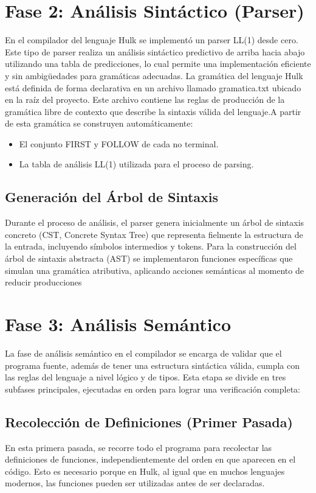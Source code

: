 \documentclass[a4paper,12pt]{article}
\begin{document}
\section{ Fase 2: Análisis Sintáctico (Parser)}
En el compilador del lenguaje Hulk se implementó un parser LL(1) desde cero. Este tipo de parser realiza un análisis sintáctico predictivo de arriba hacia abajo utilizando una tabla de predicciones, lo cual permite una implementación eficiente y sin ambigüedades para gramáticas adecuadas.
\newline
La gramática del lenguaje Hulk está definida de forma declarativa en un archivo llamado gramatica.txt ubicado en la raíz del proyecto. Este archivo contiene las reglas de producción de la gramática libre de contexto que describe la sintaxis válida del lenguaje.A partir de esta gramática se construyen automáticamente:
 \begin{itemize}
 	\item El conjunto FIRST y FOLLOW de cada no terminal.
 	\item La tabla de análisis LL(1) utilizada para el proceso de parsing.
 	
 \end{itemize}
 
 \subsection{Generación del Árbol de Sintaxis}
 Durante el proceso de análisis, el parser genera inicialmente un árbol de sintaxis concreto (CST, Concrete Syntax Tree) que representa fielmente la estructura de la entrada, incluyendo símbolos intermedios y tokens.
 \newline
 Para la construcción del árbol de sintaxis abstracta (AST) se implementaron funciones específicas que simulan una gramática atributiva, aplicando acciones semánticas al momento de reducir producciones

\section{Fase 3: Análisis Semántico}
La fase de análisis semántico en el compilador se encarga de validar que el programa fuente, además de tener una estructura sintáctica válida, cumpla con las reglas del lenguaje a nivel lógico y de tipos. Esta etapa se divide en tres subfases principales, ejecutadas en orden para lograr una verificación completa:
\subsection{ Recolección de Definiciones (Primer Pasada)}
En esta primera pasada, se recorre todo el programa para recolectar las definiciones de funciones, independientemente del orden en que aparecen en el código. Esto es necesario porque en Hulk, al igual que en muchos lenguajes modernos, las funciones pueden ser utilizadas antes de ser declaradas.
\end{document}
